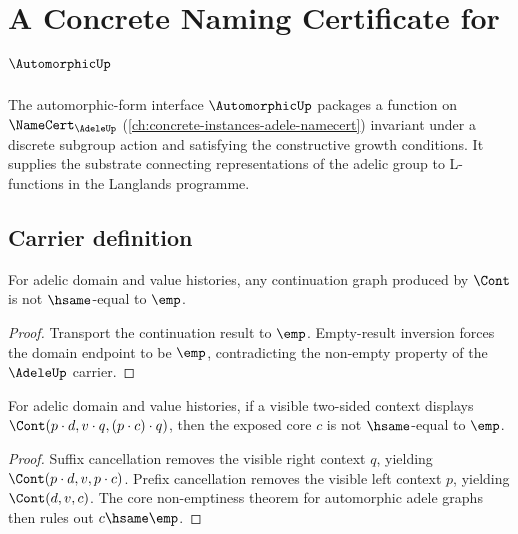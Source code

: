 \chapter{A Concrete Naming Certificate for $\AutomorphicUp$}
\label{ch:concrete-instances-automorphic-namecert}

The automorphic-form interface $\AutomorphicUp$ packages a function on $\NameCert_{\AdeleUp}$ (\autoref{ch:concrete-instances-adele-namecert}) invariant under a discrete subgroup action and satisfying the constructive growth conditions. It supplies the substrate connecting representations of the adelic group to L-functions in the Langlands programme.

\section{Carrier definition}
\label{sec:automorphic-carrier}

\begin{theorem}
\label{thm:automorphic-adele-graph-cont-nonempty}
For adelic domain and value histories, any continuation graph produced by
\(\Cont\) is not \(\hsame\)-equal to \(\emp\).
\end{theorem}
\begin{proof}
Transport the continuation result to \(\emp\). Empty-result inversion forces the
domain endpoint to be \(\emp\), contradicting the non-empty property of the
\(\AdeleUp\) carrier.
\end{proof}

\begin{theorem}
\label{thm:automorphic-adele-graph-visible-context-core-nonempty}
For adelic domain and value histories, if a visible two-sided context displays
\(\Cont(p \cdot d, v \cdot q, (p \cdot c) \cdot q)\), then the exposed core
\(c\) is not \(\hsame\)-equal to \(\emp\).
\end{theorem}
\begin{proof}
Suffix cancellation removes the visible right context \(q\), yielding
\(\Cont(p \cdot d, v, p \cdot c)\). Prefix cancellation removes the visible
left context \(p\), yielding \(\Cont(d,v,c)\). The core non-emptiness theorem
for automorphic adele graphs then rules out \(c\hsame\emp\).
\end{proof}

